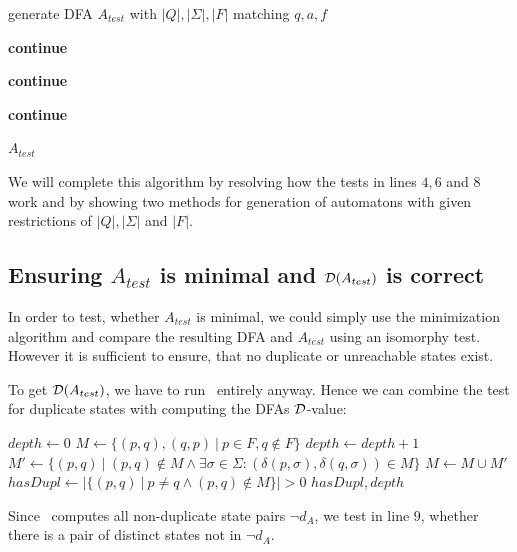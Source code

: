 \vspace{0.2cm}
\begin{algorithmic}[1]
		
			\vspace{0.2cm}
		
			\State generate DFA $A_{test}$ with $|Q|, |\Sigma|, |F|$ matching $q, a, f$
			
			\vspace{0.2cm}
			
				\State \textbf{continue}
			\EndIf
			
				\State \textbf{continue}
			\EndIf
			
				\State \textbf{continue}
			\EndIf
			
			\vspace{0.2cm}
			
			\State\Return $A_{test}$
		\EndWhile
	\EndFunction
\end{algorithmic}
\vspace{0.2cm}
We will complete this algorithm by resolving how the tests in lines $4, 6$ and $8$ work and by showing two methods for generation of automatons with given restrictions of $|Q|, |\Sigma|$ and $|F|$.

\subsection{Ensuring $A_{test}$ is minimal and $\mathcal{D}(A_{test})$ is correct}

In order to test, whether $A_{test}$ is minimal, we could simply use the minimization algorithm and compare the resulting DFA and $A_{test}$ using an isomorphy test. However it is sufficient to ensure, that no duplicate or unreachable states exist.

To get $\mathcal{D}(A_{test})$, we have to run \MinMark\ entirely anyway. Hence we can combine the test for duplicate states with computing the DFAs $\mathcal{D}$-value:
\vspace{0.2cm}
\begin{algorithmic}[1]
		\State $depth \gets 0$
		\State $M \gets \{ (p,q), (q,p)\ |\ p \in F, q \notin F \}$
		\Do
			\State $depth \gets depth + 1$
			\State $M' \gets \{ (p,q)\ |\ (p,q) \notin M \land \exists \sigma \in \Sigma \colon (\delta(p,\sigma), \delta(q,\sigma)) \in M \}$
			\State $M \gets M \cup M'$
		\State $hasDupl \gets | \{ (p,q)\ |\ p \neq q \land (p,q) \notin M \} | > 0$
		\State \Return $hasDupl, depth$
	\EndFunction
\end{algorithmic}
\vspace{0.2cm}
Since \MinMark\ computes all non-duplicate state pairs $\neg d_A$, we test in line $9$, whether there is a pair of distinct states not in $\neg d_A$.

